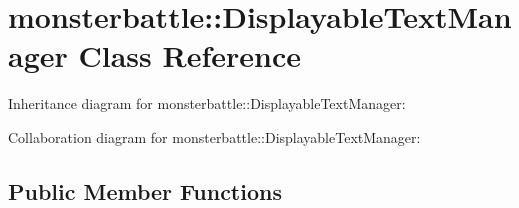\hypertarget{classmonsterbattle_1_1DisplayableTextManager}{}\section{monsterbattle\+:\+:Displayable\+Text\+Manager Class Reference}
\label{classmonsterbattle_1_1DisplayableTextManager}


Inheritance diagram for monsterbattle\+:\+:Displayable\+Text\+Manager\+:


Collaboration diagram for monsterbattle\+:\+:Displayable\+Text\+Manager\+:
\subsection*{Public Member Functions}
